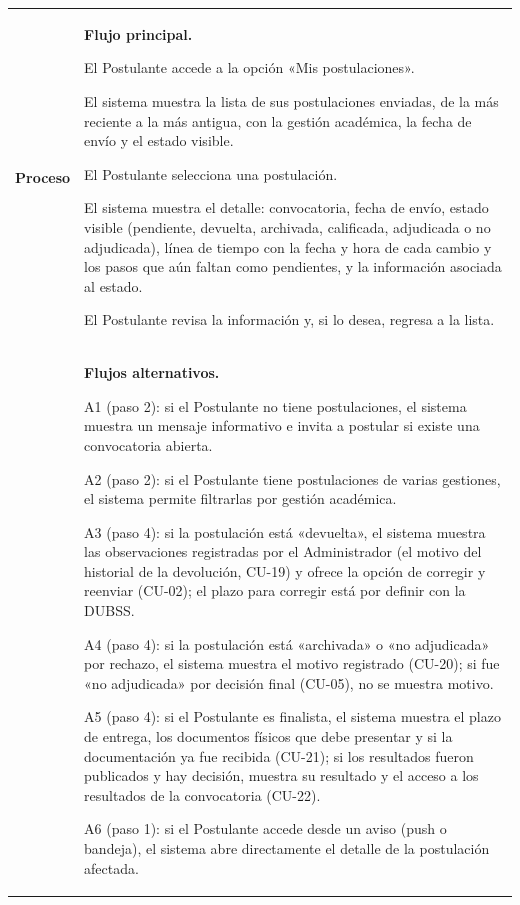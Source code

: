 \begin{longtable}{>{\raggedright\arraybackslash}p{2.9cm} >{\raggedright\arraybackslash}p{12.6cm}}
\midrule
\textbf{Proceso} & \textbf{Flujo principal.}
\begin{cupasos}
    \item El Postulante accede a la opción «Mis postulaciones».
    \item El sistema muestra la lista de sus postulaciones enviadas, de la más reciente a la más antigua, con la gestión académica, la fecha de envío y el estado visible.
    \item El Postulante selecciona una postulación.
    \item El sistema muestra el detalle: convocatoria, fecha de envío, estado visible (pendiente, devuelta, archivada, calificada, adjudicada o no adjudicada), línea de tiempo con la fecha y hora de cada cambio y los pasos que aún faltan como pendientes, y la información asociada al estado.
    \item El Postulante revisa la información y, si lo desea, regresa a la lista.
\end{cupasos} \\
 & \textbf{Flujos alternativos.}
\begin{cuvin}
    \item A1 (paso 2): si el Postulante no tiene postulaciones, el sistema muestra un mensaje informativo e invita a postular si existe una convocatoria abierta.
    \item A2 (paso 2): si el Postulante tiene postulaciones de varias gestiones, el sistema permite filtrarlas por gestión académica.
    \item A3 (paso 4): si la postulación está «devuelta», el sistema muestra las observaciones registradas por el Administrador (el motivo del historial de la devolución, CU-19) y ofrece la opción de corregir y reenviar (CU-02); el plazo para corregir está por definir con la DUBSS.
    \item A4 (paso 4): si la postulación está «archivada» o «no adjudicada» por rechazo, el sistema muestra el motivo registrado (CU-20); si fue «no adjudicada» por decisión final (CU-05), no se muestra motivo.
    \item A5 (paso 4): si el Postulante es finalista, el sistema muestra el plazo de entrega, los documentos físicos que debe presentar y si la documentación ya fue recibida (CU-21); si los resultados fueron publicados y hay decisión, muestra su resultado y el acceso a los resultados de la convocatoria (CU-22).
    \item A6 (paso 1): si el Postulante accede desde un aviso (push o bandeja), el sistema abre directamente el detalle de la postulación afectada.

\end{cuvin}
\end{longtable}
